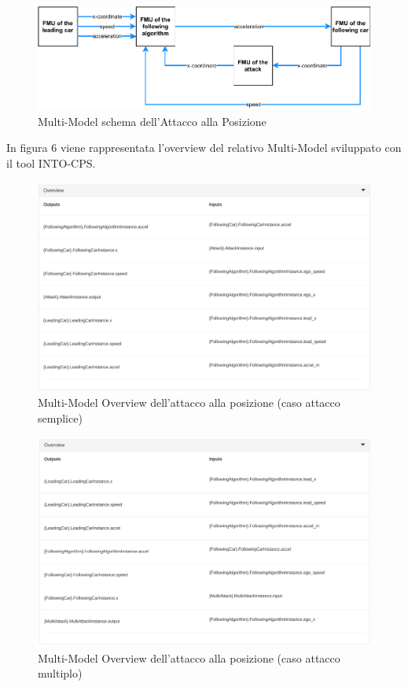 \begin{figure}[H]
	\centering
	\includegraphics{img/XAttackSchema.pdf}
	\caption{Multi-Model schema dell'Attacco alla Posizione}
\end{figure}

In figura 6 viene rappresentata l'overview del relativo Multi-Model sviluppato con il tool INTO-CPS. 


\begin{figure}[H]
	\centering
	\includegraphics[width=\textwidth]{img/OverviewXSingle.png}
	\caption{Multi-Model Overview dell'attacco alla posizione (caso attacco semplice)}
\end{figure}
\begin{figure}[H]
	\centering
	\includegraphics[width=\textwidth]{img/OverviewXMulti.png}
	\caption{Multi-Model Overview dell'attacco alla posizione (caso attacco multiplo)}
\end{figure}

